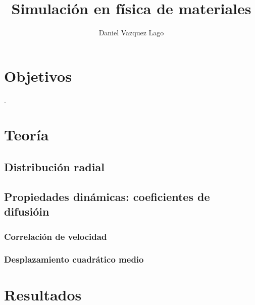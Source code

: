 \documentclass[11pt]{article} %
\author{Daniel Vazquez Lago}
\title{Simulación en física de materiales}
\begin{document}
	
	
\maketitle
\newpage
\tableofcontents
	
\setlength{\parskip}{1.5mm} %
	
\section{Objetivos}	

\cite{Haile}.

\section{Teoría}

\subsection{Distribución radial}

\subsection{Propiedades dinámicas: coeficientes de difusióin}

\subsubsection{Correlación de velocidad}

\subsubsection{Desplazamiento cuadrático medio}

	
\section{Resultados}	
	
\end{document}
